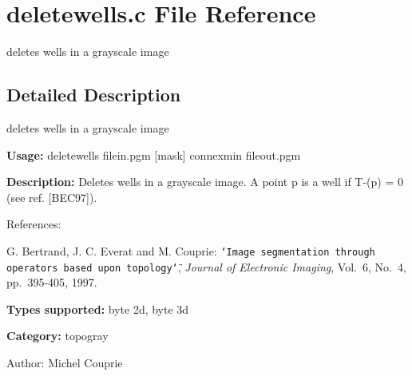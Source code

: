 \section{deletewells.c File Reference}
\label{deletewells_8c}
deletes wells in a grayscale image 



\subsection{Detailed Description}
deletes wells in a grayscale image 

{\bf Usage:} deletewells filein.pgm [mask] connexmin fileout.pgm

{\bf Description:} Deletes wells in a grayscale image. A point p is a well if T-(p) = 0 (see ref. [BEC97]).

References:\par
 [BEC97] G. Bertrand, J. C. Everat and M. Couprie: {\tt \char`\"{}Image segmentation through operators based upon topology\char`\"{}}, {\em  Journal of Electronic Imaging\/}, Vol.~6, No.~4, pp.~395-405, 1997.\par


{\bf Types supported:} byte 2d, byte 3d

{\bf Category:} topogray

\begin{Desc}
\item[Author:]Michel Couprie \end{Desc}
